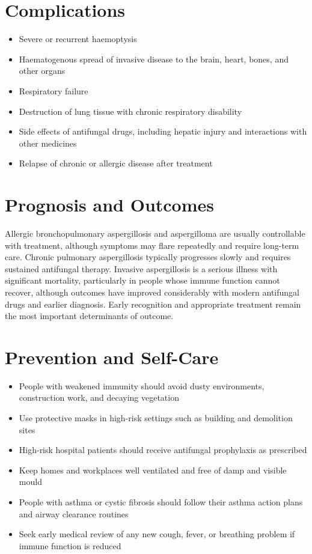 \section*{Complications}
\begin{itemize}
    \item Severe or recurrent haemoptysis
    \item Haematogenous spread of invasive disease to the brain, heart, bones, and other organs
    \item Respiratory failure
    \item Destruction of lung tissue with chronic respiratory disability
    \item Side effects of antifungal drugs, including hepatic injury and interactions with other medicines
    \item Relapse of chronic or allergic disease after treatment
\end{itemize}

\section*{Prognosis and Outcomes}
Allergic bronchopulmonary aspergillosis and aspergilloma are usually controllable with treatment, although symptoms may flare repeatedly and require long-term care. Chronic pulmonary aspergillosis typically progresses slowly and requires sustained antifungal therapy. Invasive aspergillosis is a serious illness with significant mortality, particularly in people whose immune function cannot recover, although outcomes have improved considerably with modern antifungal drugs and earlier diagnosis. Early recognition and appropriate treatment remain the most important determinants of outcome.

\section*{Prevention and Self-Care}
\begin{itemize}
    \item People with weakened immunity should avoid dusty environments, construction work, and decaying vegetation
    \item Use protective masks in high-risk settings such as building and demolition sites
    \item High-risk hospital patients should receive antifungal prophylaxis as prescribed
    \item Keep homes and workplaces well ventilated and free of damp and visible mould
    \item People with asthma or cystic fibrosis should follow their asthma action plans and airway clearance routines
    \item Seek early medical review of any new cough, fever, or breathing problem if immune function is reduced
\end{itemize}

